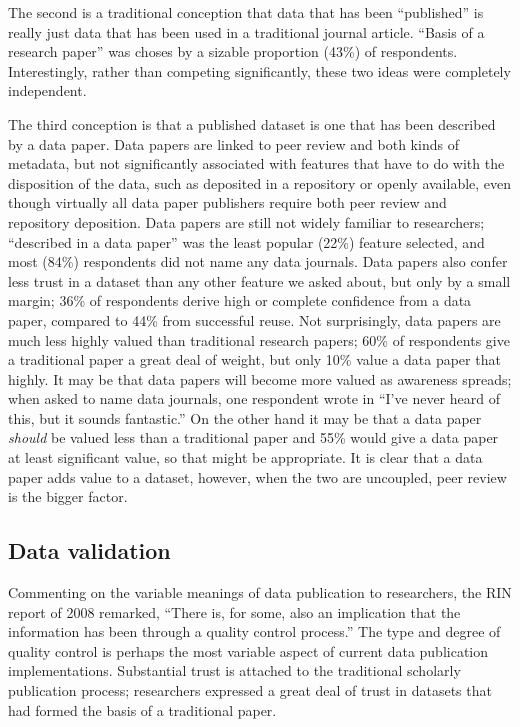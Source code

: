 \documentclass[10pt]{article}
\begin{document}
The second is a traditional conception that data that has been ``published'' is really just data that has been used in a traditional journal article. 
``Basis of a research paper'' was choses by a sizable proportion (43\%) of respondents.
Interestingly, rather than competing significantly, these two ideas were completely independent.

The third conception is that a published dataset is one that has been described by a data paper.
Data papers are linked to peer review and both kinds of metadata, but not significantly associated with features that have to do with the disposition of the data, such as deposited in a repository or openly available, even though virtually all data paper publishers require both peer review and repository deposition.
Data papers are still not widely familiar to researchers; ``described in a data paper'' was the least popular (22\%) feature selected, and most (84\%) respondents did not name any data journals.
Data papers also confer less trust in a dataset than any other feature we asked about, but only by a small margin; 36\% of respondents derive high or complete confidence from a data paper, compared to 44\% from successful reuse.
Not surprisingly, data papers are much less highly valued than traditional research papers; 60\% of respondents give a traditional paper a great deal of weight, but only 10\% value a data paper that highly.
It may be that data papers will become more valued as awareness spreads; when asked to name data journals, one respondent wrote in ``I've never heard of this, but it sounds fantastic.''
On the other hand it may be that a data paper \emph{should} be valued less than a traditional paper and 55\% would give a data paper at least significant value, so that might be appropriate.
It is clear that a data paper adds value to a dataset, however, when the two are uncoupled, peer review is the bigger factor.
 
\subsection*{Data validation}

Commenting on the variable meanings of data publication to researchers, the RIN report of 2008 remarked, ``There is, for some, also an implication that the information has been through a quality control process.''\cite{swan_share_2008} 
The type and degree of quality control is perhaps the most variable aspect of current data publication implementations. 
Substantial trust is attached to the traditional scholarly publication process; researchers expressed a great deal of trust in datasets that had formed the basis of a traditional paper.
\end{document}

